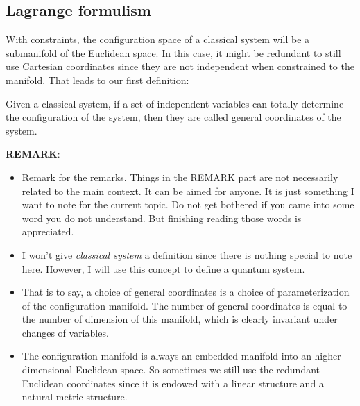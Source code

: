 \subsection{Lagrange formulism}
With constraints, the configuration space of a classical system will be a submanifold of the  Euclidean space. In this case, it might be redundant to still use Cartesian coordinates since they are not independent when constrained to the manifold. That leads to our first definition:

\begin{definition}
    Given a classical system, if a set of independent variables can totally determine the configuration of the system, then they are called general coordinates of the system.
\end{definition}

\textbf{REMARK}:
\begin{itemize}
    \item Remark for the remarks. Things in the REMARK part are not necessarily related to the main context. It can be aimed for anyone. It is just something I want to note for the current topic. Do not get bothered if you came into some word you do not understand. But finishing reading those words is appreciated.
    \item I won't give \textit{classical system} a definition since there is nothing special to note here. However, I will use this concept to define a quantum system.
    \item That is to say, a choice of general coordinates is a choice of parameterization of the configuration manifold. The number of general coordinates is equal to the number of dimension of this manifold, which is clearly invariant under changes of variables.
    \item The configuration manifold is always an embedded manifold into an higher dimensional Euclidean space. So sometimes we still use the redundant Euclidean coordinates since it is endowed with a linear structure and a natural metric structure.
\end{itemize}

